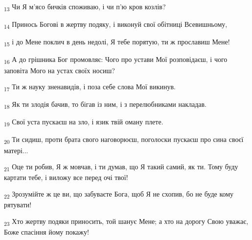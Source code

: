 \begin{tcolorbox}
\textsubscript{13} Чи Я м'ясо бичків споживаю, і чи п'ю кров козлів?
\end{tcolorbox}
\begin{tcolorbox}
\textsubscript{14} Принось Богові в жертву подяку, і виконуй свої обітниці Всевишньому,
\end{tcolorbox}
\begin{tcolorbox}
\textsubscript{15} і до Мене поклич в день недолі, Я тебе порятую, ти ж прославиш Мене!
\end{tcolorbox}
\begin{tcolorbox}
\textsubscript{16} А до грішника Бог промовляє: Чого про устави Мої розповідаєш, і чого заповіта Мого на устах своїх носиш?
\end{tcolorbox}
\begin{tcolorbox}
\textsubscript{17} Ти ж науку зненавидів, і поза себе слова Мої викинув.
\end{tcolorbox}
\begin{tcolorbox}
\textsubscript{18} Як ти злодія бачив, то бігав із ним, і з перелюбниками накладав.
\end{tcolorbox}
\begin{tcolorbox}
\textsubscript{19} Свої уста пускаєш на зло, і язик твій оману плете.
\end{tcolorbox}
\begin{tcolorbox}
\textsubscript{20} Ти сидиш, проти брата свого наговорюєш, поголоски пускаєш про сина своєї матері...
\end{tcolorbox}
\begin{tcolorbox}
\textsubscript{21} Оце ти робив, Я ж мовчав, і ти думав, що Я такий самий, як ти. Тому буду картати тебе, і виложу все перед очі твої!
\end{tcolorbox}
\begin{tcolorbox}
\textsubscript{22} Зрозумійте ж це ви, що забуваєте Бога, щоб Я не схопив, бо не буде кому рятувати!
\end{tcolorbox}
\begin{tcolorbox}
\textsubscript{23} Хто жертву подяки приносить, той шанує Мене; а хто на дорогу Свою уважає, Боже спасіння йому покажу!
\end{tcolorbox}
